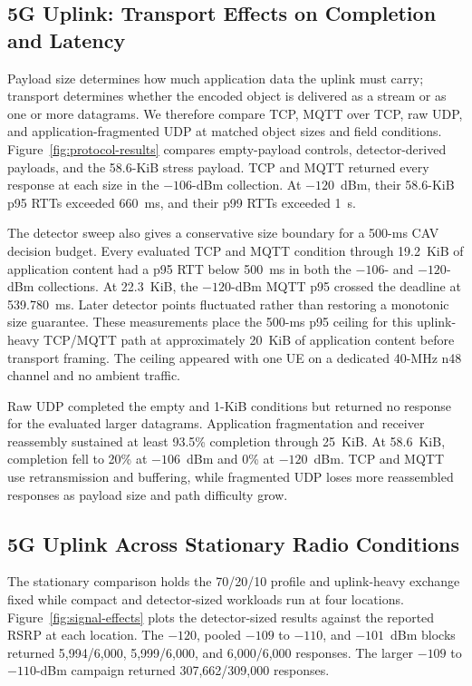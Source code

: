 \subsection{5G Uplink: Transport Effects on Completion and Latency}
\label{sec:results-protocol}

Payload size determines how much application data the uplink must carry;
transport determines whether the encoded object is delivered as a stream or as
one or more datagrams. We therefore compare TCP, MQTT over TCP, raw UDP, and
application-fragmented UDP at matched object sizes and field conditions.
Figure~\ref{fig:protocol-results} compares empty-payload controls, detector-derived
payloads, and the 58.6-KiB stress payload. TCP and MQTT returned every response
at each size in the $-106$-dBm collection. At $-120$~dBm, their 58.6-KiB p95
RTTs exceeded 660~ms, and their p99 RTTs exceeded 1~s.

The detector sweep also gives a conservative size boundary for a 500-ms CAV
decision budget. Every evaluated TCP and MQTT condition through 19.2~KiB of
application content had a p95 RTT below 500~ms in both the $-106$- and
$-120$-dBm collections. At 22.3~KiB, the $-120$-dBm MQTT p95 crossed the deadline at
539.780~ms. Later detector points fluctuated rather than restoring a monotonic
size guarantee. These measurements place the 500-ms p95 ceiling for this
uplink-heavy TCP/MQTT path at approximately 20~KiB of application content
before transport framing. The ceiling appeared with one UE on a dedicated
40-MHz n48 channel and no ambient traffic.

Raw UDP completed the empty and 1-KiB conditions but returned no response for
the evaluated larger datagrams. Application fragmentation and receiver
reassembly sustained at least 93.5\% completion through 25~KiB. At 58.6~KiB,
completion fell to 20\% at $-106$~dBm and 0\% at $-120$~dBm. TCP and MQTT use
retransmission and buffering, while fragmented UDP loses more reassembled
responses as payload size and path difficulty grow.

\subsection{5G Uplink Across Stationary Radio Conditions}
\label{sec:results-signal-tdd}

The stationary comparison holds the 70/20/10 profile and uplink-heavy exchange
fixed while compact and detector-sized workloads run at four locations.
Figure~\ref{fig:signal-effects} plots the detector-sized results against the
reported RSRP at each location. The $-120$, pooled $-109$ to $-110$, and
$-101$~dBm blocks returned 5,994/6,000, 5,999/6,000, and 6,000/6,000 responses.
The larger $-109$ to $-110$-dBm campaign returned 307,662/309,000 responses.

